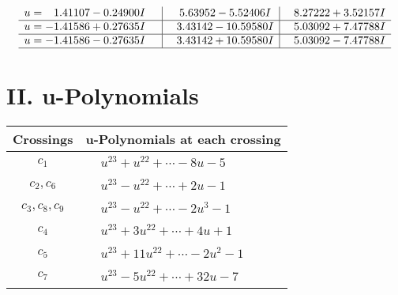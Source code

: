 \documentclass[1p]{elsarticle_modified}
\theoremstyle{definition}
\begin{document}
$$\begin{array}{c|c|c}
\begin{aligned}
u &= \phantom{-}1.41107 - 0.24900 I\end{aligned}
 & \phantom{-}5.63952 - 5.52406 I & \phantom{-}8.27222 + 3.52157 I \\ \hline\begin{aligned}
u &= -1.41586 + 0.27635 I\end{aligned}
 & \phantom{-}3.43142 - 10.59580 I & \phantom{-}5.03092 + 7.47788 I \\ \hline\begin{aligned}
u &= -1.41586 - 0.27635 I\end{aligned}
 & \phantom{-}3.43142 + 10.59580 I & \phantom{-}5.03092 - 7.47788 I\\
 \hline 
 \end{array}$$\newpage
\newpage\renewcommand{\arraystretch}{1}
\centering \section*{ II. u-Polynomials}
\begin{tabular}{m{50pt}|m{274pt}}
Crossings & \hspace{64pt}u-Polynomials at each crossing \\
\hline $$\begin{aligned}c_{1}\end{aligned}$$&$\begin{aligned}
&u^{23}+u^{22}+\cdots-8 u-5
\end{aligned}$\\
\hline $$\begin{aligned}c_{2},c_{6}\end{aligned}$$&$\begin{aligned}
&u^{23}- u^{22}+\cdots+2 u-1
\end{aligned}$\\
\hline $$\begin{aligned}c_{3},c_{8},c_{9}\end{aligned}$$&$\begin{aligned}
&u^{23}- u^{22}+\cdots-2 u^3-1
\end{aligned}$\\
\hline $$\begin{aligned}c_{4}\end{aligned}$$&$\begin{aligned}
&u^{23}+3 u^{22}+\cdots+4 u+1
\end{aligned}$\\
\hline $$\begin{aligned}c_{5}\end{aligned}$$&$\begin{aligned}
&u^{23}+11 u^{22}+\cdots-2 u^2-1
\end{aligned}$\\
\hline $$\begin{aligned}c_{7}\end{aligned}$$&$\begin{aligned}
&u^{23}-5 u^{22}+\cdots+32 u-7
\end{aligned}$\\
\hline
\end{tabular}\newpage\renewcommand{\arraystretch}{1}
\end{document}
